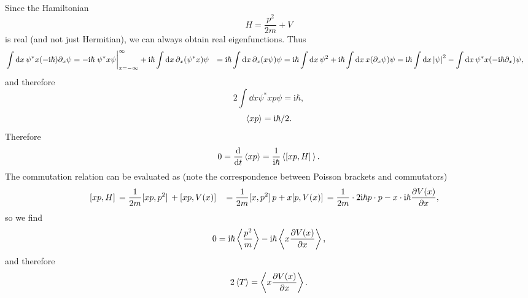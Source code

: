 \documentclass[hyperref, a4paper]{article}
\newcommand*{\ii}{\mathrm{i}}
\def\\{}%
\begin{document}
\subsection{}

Since the Hamiltonian 
\begin{equation}
    H = \frac{p^2}{2m} + V 
\end{equation}
is real (and not just Hermitian), 
we can always obtain real eigenfunctions.
Thus
\[
    \begin{aligned}
        \int \dd{x} \psi^* x (- \ii \hbar) \partial_x \psi 
        &= - \ii \hbar \eval{\psi^* x \psi}^{\infty}_{x = - \infty}
        + \ii \hbar \int \dd{x} \partial_x (\psi^* x) \psi \\
        &= \ii \hbar \int \dd{x} \partial_x(x \psi) \psi 
        = \ii \hbar \int \dd{x} \psi^2 + \ii \hbar \int \dd{x} x (\partial_x \psi) \psi \\
        &= \ii \hbar \int \dd{x} \abs{\psi}^2 
        - \int \dd{x} \psi^* x (- \ii \hbar \partial_x) \psi ,
    \end{aligned}
\]
and therefore 
\[
    2 \int \dd{x} \psi^* x p \psi = \ii \hbar ,
\]
\begin{equation}
    \expval{x p} =  \ii \hbar / 2.
\end{equation}
Therefore 
\[
    0 = \dv{t} \expval{xp}
    = \frac{1}{\ii \hbar} \expval{\comm*{xp}{H}}.
\]
The commutation relation can be evaluated as 
(note the correspondence between Poisson brackets 
and commutators)
\[
    \begin{aligned}
        \comm*{xp}{H} &= \frac{1}{2m} \comm*{xp}{p^2} + \comm*{xp}{V(x)} \\
        &= \frac{1}{2m} \comm*{x}{p^2} p + x \comm*{p}{V(x)} \\
        &= \frac{1}{2m} \cdot 2 \ii \hbar p \cdot p 
        - x \cdot \ii \hbar \pdv{V(x)}{x},
    \end{aligned}
\]
so we find 
\[
    0 = \ii \hbar \expval{\frac{p^2}{m}} - \ii \hbar \expval{x \pdv{V(x)}{x}},
\]
and therefore
\begin{equation}
    2 \expval{T} = \expval{x \pdv{V(x)}{x}}.
\end{equation}

\subsection{}



\subsection{}
\end{document}
